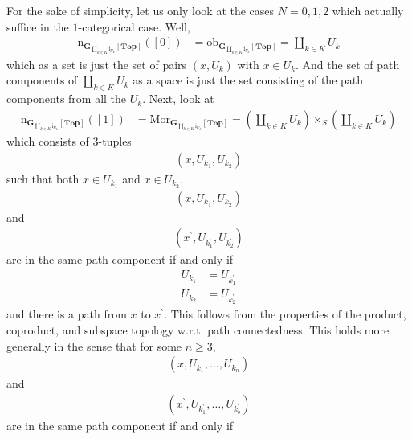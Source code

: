 For the sake of simplicity, let us only look at the cases $N = 0,1,2$ which actually suffice in the $1$-categorical case.
Well,
\begin{align*}
  \mathrm{n}_{\mathbf{G}_{\coprod_{k \in K}\mathrm{i}_{U_{k}}}[\mathbf{Top}]}
  ([0])
  &=
  \mathrm{ob}_{\mathbf{G}_{\coprod_{k \in K}\mathrm{i}_{U_{k}}}[\mathbf{Top}]}
  =
  \coprod_{k \in K}
  U_{k}
\end{align*}
which as a set is just the set of pairs $(x,U_{k})$ with $x \in U_{k}$.
And the set of path components of $\coprod_{k \in K} U_{k}$ as a space is just the set consisting of the path components from all the $U_{k}$.
Next, look at
\begin{align*}
  \mathrm{n}_{\mathbf{G}_{\coprod_{k \in K}\mathrm{i}_{U_{k}}}[\mathbf{Top}]}
  ([1])
  &=
  \mathrm{Mor}_{\mathbf{G}_{\coprod_{k \in K}\mathrm{i}_{U_{k}}}[\mathbf{Top}]}
  =
  \left(
    \coprod_{k \in K}
    U_{k}
  \right)
  \times_{S}
  \left(
    \coprod_{k \in K}
    U_{k}
  \right)
\end{align*}
which consists of $3$-tuples
\begin{align*}
  \left(
    x,
    U_{k_{1}},
    U_{k_{2}}
  \right)
\end{align*}
such that both $x \in U_{k_{1}}$ and $x \in U_{k_{2}}$.
\begin{align*}
  \left(
    x,
    U_{k_{1}},
    U_{k_{2}}
  \right)
\end{align*}
and
\begin{align*}
  \left(
    x^{\backprime},
    U_{k_{1}^{\backprime}},
    U_{k_{2}^{\backprime}}
  \right)
\end{align*}
are in the same path component if and only if
\begin{align*}
  U_{k_{1}}
  &=
  U_{k_{1}^{\backprime}}
  \\
  U_{k_{2}}
  &=
  U_{k_{2}^{\backprime}}
\end{align*}
and there is a path from $x$ to $x^{\backprime}$.
This follows from the properties of the product, coproduct, and subspace topology w.r.t. path connectedness.
This holds more generally in the sense that for some $n \geq 3$,
\begin{align*}
  \left(
    x,
    U_{k_{1}},
    \ldots,
    U_{k_{n}}
  \right)
\end{align*}
and
\begin{align*}
  \left(
    x^{\backprime},
    U_{k_{1}^{\backprime}},
    \ldots,
    U_{k_{b}^{\backprime}}
  \right)
\end{align*}
are in the same path component if and only if
